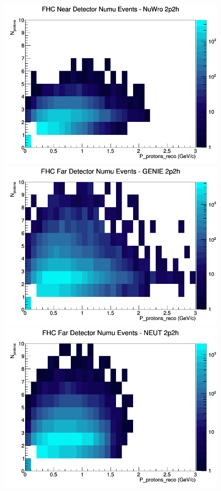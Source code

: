 \documentclass[12pt]{article}
\begin{document}
\begin{figure}[h]
\includegraphics[width=\linewidth]{eff_N_P/LAr/protons/2p2h_FHC_ND_numu_N_P_NuWro.png}
\endminipage
\newline
{}
\includegraphics[width=\linewidth]{eff_N_P/LAr/protons/2p2h_FHC_FD_numu_N_P_GENIE.png}
\endminipage
{}
\includegraphics[width=\linewidth]{eff_N_P/LAr/protons/2p2h_FHC_FD_numu_N_P_NEUT.png}

\end{figure}
\end{document}
